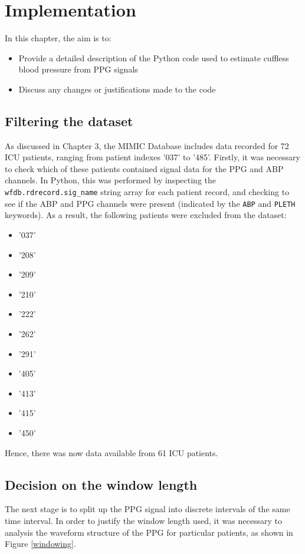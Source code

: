 \section{Implementation}
In this chapter, the aim is to:

\begin{itemize}
    \item Provide a detailed description of the Python code used to estimate cuffless blood pressure from PPG signals
    \item Discuss any changes or justifications made to the code
\end{itemize}

\subsection{Filtering the dataset}
As discussed in Chapter 3, the MIMIC Database includes data
recorded for 72 ICU patients, ranging from patient indexes '037' to '485'. Firstly, it was necessary to check which 
of these patients contained signal data for the PPG and ABP channels. In Python, this was performed by inspecting the 
\texttt{wfdb.rdrecord.sig\_name} string array for each patient record, and checking to see if the ABP and PPG channels were present (indicated by the 
\texttt{ABP} and \texttt{PLETH} keywords). As a result, the following patients were excluded from the dataset:

\begin{itemize}
    \item '037'
    \item '208'
    \item '209'
    \item '210'
    \item '222'
    \item '262'
    \item '291'
    \item '405'
    \item '413'
    \item '415'
    \item '450'
\end{itemize}\noindent Hence, there was now data available from 61 ICU patients.

\subsection{Decision on the window length}
The next stage is to split up the PPG signal into discrete intervals of the same time interval. In order to justify the window length used, 
it was necessary to analysis the waveform structure of the PPG for particular patients, as shown in Figure \ref{windowing}. 

